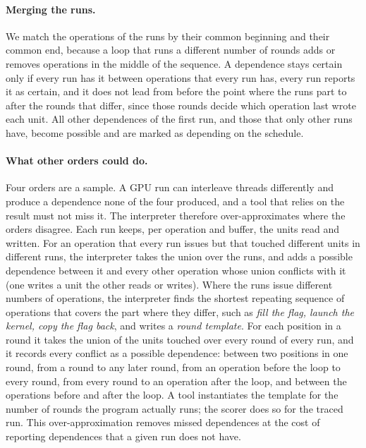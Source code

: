 \documentclass[11pt]{article}
\newcommand{\term}[1]{\emph{#1}}
\begin{document}
\paragraph{Merging the runs.} We match the operations of the runs by their common beginning and their common end,
because a loop that runs a different number of rounds adds or removes operations in the middle of the sequence. A
dependence stays certain only if every run has it between operations that every run has, every run reports it as
certain, and it does not lead from before the point where the runs part to after the rounds that differ, since
those rounds decide which operation last wrote each unit. All other dependences of the first run, and those that
only other runs have, become possible and are marked as depending on the schedule.

\paragraph{What other orders could do.} Four orders are a sample. A GPU run can interleave threads differently and
produce a dependence none of the four produced, and a tool that relies on the result must not miss it. The
interpreter therefore over-approximates where the orders disagree. Each run keeps, per operation and buffer, the
units read and written. For an operation that every run issues but that touched different units in different
runs, the interpreter takes the union over the runs, and adds a possible dependence between it and every other
operation whose union conflicts with it (one writes a unit the other reads or writes). Where the runs issue
different numbers of operations, the interpreter finds the shortest repeating sequence of operations that covers
the part where they differ, such as \emph{fill the flag, launch the kernel, copy the flag back}, and writes a
\term{round template}. For each position in a round it takes the union of the units touched over every round of
every run, and it records every conflict as a possible dependence: between two positions in one round, from a round
to any later round, from an operation before the loop to every round, from every round to an operation after the
loop, and between the operations before and after the loop. A tool instantiates the template for the number of rounds
the program actually runs; the scorer does so for the traced run. This over-approximation removes missed dependences
at the cost of reporting dependences that a given run does not have.
\end{document}
